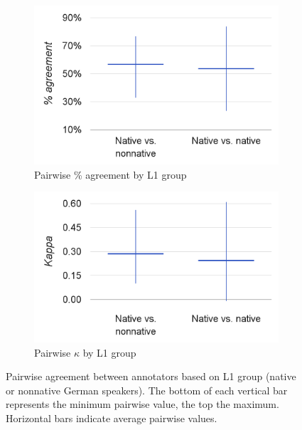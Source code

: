 		\begin{figure}[p]
			\centering
			\begin{subfigure}{.7\textwidth}
				\centering
				\includegraphics[width=\textwidth]{img/annotation/pairAgreeL1-noTitle}
				\caption{Pairwise \% agreement by L1 group}
				\label{fig:agreement:L1:pct}
			\end{subfigure}%

			\vspace{2em}			
			
			\begin{subfigure}{.7\textwidth}
				\centering
				\includegraphics[width=\textwidth]{img/annotation/pairKappaL1-noTitle}
				\caption{Pairwise $\kappa$ by L1 group}
				\label{fig:agreement:L1:k}
			\end{subfigure}%
			
			\vspace{1.5em}
			
			\caption[Pairwise agreement statistics by annotator L1 group]{Pairwise agreement between annotators based on L1 group (native or nonnative German speakers).
	The bottom of each vertical bar represents the minimum pairwise value, the top the maximum. Horizontal bars indicate average pairwise values.
			}
			\label{fig:agreement:L1}
		\end{figure}
		
